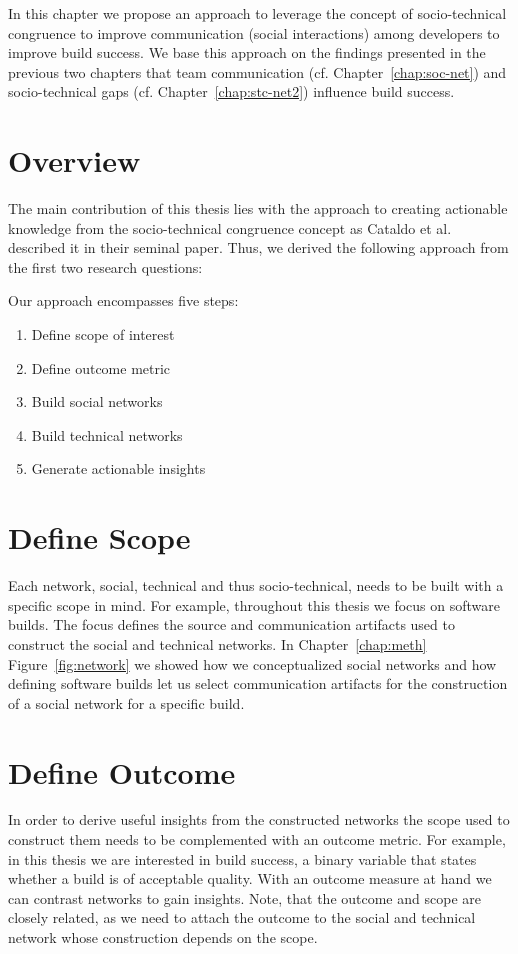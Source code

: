 \label{chap:approach}
In this chapter we propose an approach to leverage the concept of socio-technical congruence to improve communication (social interactions) among developers to improve build success.
We base this approach on the findings presented in the previous two chapters that team communication (cf. Chapter~\ref{chap:soc-net}) and socio-technical gaps (cf. Chapter~\ref{chap:stc-net2})  influence build success.

\section{Overview}
The main contribution of this thesis lies with the approach to creating actionable knowledge from the socio-technical congruence concept as Cataldo et al.~\cite{cataldo:cscw:2006} described it in their seminal paper.
Thus, we derived the following approach from the first two research questions:

Our approach encompasses five steps:
\begin{enumerate}
\item Define scope of interest
\item Define outcome metric
\item Build social networks
\item Build technical networks
\item Generate actionable insights
\end{enumerate}

\section{Define Scope} 
Each network, social, technical and thus socio-technical, needs to be built with a specific scope in mind.
For example, throughout this thesis we focus on software builds.
The focus defines the source and communication artifacts used to construct the social and technical networks.
In Chapter~\ref{chap:meth} Figure~\ref{fig:network} we showed how we conceptualized social networks and how defining software builds let us select communication artifacts for the construction of a social network for a specific build.

\section{Define Outcome}
In order to derive useful insights from the constructed networks the scope used to construct them needs to be complemented with an outcome metric.
For example, in this thesis we are interested in build success, a binary variable that states whether a build is of acceptable quality.
With an outcome measure at hand we can contrast networks to gain insights.
Note, that the outcome and scope are closely related, as we need to attach the outcome to the social and technical network whose construction depends on the scope.


